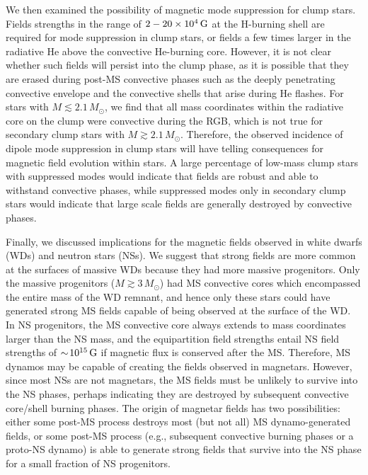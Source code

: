 We then examined the possibility of magnetic mode suppression for clump stars. Fields strengths in the range of $2-20 \times 10^4 \, {\rm G}$ at the H-burning shell are required for mode suppression in clump stars, or fields a few times larger in the radiative He above the convective He-burning core. However, it is not clear whether such fields will persist into the clump phase, as it is possible that they are erased during post-MS convective phases such as the deeply penetrating convective envelope and the convective shells that arise during He flashes. For stars with $M \lesssim 2.1 \, M_\odot$, we find that all mass coordinates within the radiative core on the clump were convective during the RGB, which is not true for secondary clump stars with $M \gtrsim 2.1 \, M_\odot$. Therefore, the observed incidence of dipole mode suppression in clump stars will have telling consequences for magnetic field evolution within stars. A large percentage of low-mass clump stars with suppressed modes would indicate that fields are robust and able to withstand convective phases, while suppressed modes only in secondary clump stars would indicate that large scale fields are generally destroyed by convective phases.

Finally, we discussed implications for the magnetic fields observed in white dwarfs (WDs) and neutron stars (NSs). We suggest that strong fields are more common at the surfaces of massive WDs because they had more massive progenitors. Only the massive progenitors ($M \gtrsim 3 \, M_\odot$) had MS convective cores which encompassed the entire mass of the WD remnant, and hence only these stars could have generated strong MS fields capable of being observed at the surface of the WD. In NS progenitors, the MS convective core always extends to mass coordinates larger than the NS mass, and the equipartition field strengths entail NS field strengths of $\sim \! 10^{15} \, {\rm G}$ if magnetic flux is conserved after the MS. Therefore, MS dynamos may be capable of creating the fields observed in magnetars. However, since most NSs are not magnetars, the MS fields must be unlikely to survive into the NS phases, perhaps indicating they are destroyed by subsequent convective core/shell burning phases. The origin of magnetar fields has two possibilities: either some post-MS process destroys most (but not all) MS dynamo-generated fields, or some post-MS process (e.g., subsequent convective burning phases or a proto-NS dynamo) is able to generate strong fields that survive into the NS phase for a small fraction of NS progenitors.
  
  
  
  
  
  
  